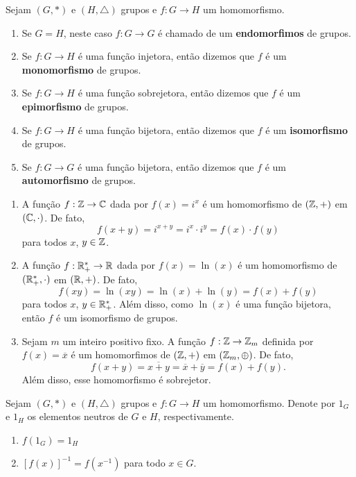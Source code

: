 \begin{observacao}
	Sejam $(G, *)$ e $(H, \triangle)$ grupos e $f : G \to H$ um homomorfismo.
	\begin{enumerate}[label={\arabic*})]
		\item Se $G = H$, neste caso $f : G \to G$ \'e chamado de um \textbf{endomorfimos} de grupos.
		\item Se $f : G \to H$ \'e uma fun\c{c}\~ao injetora, ent\~ao dizemos que $f$ \'e um \textbf{monomorfismo} de grupos.
		\item Se $f : G \to H$ \'e uma fun\c{c}\~ao sobrejetora, ent\~ao dizemos que $f$ \'e um \textbf{epimorfismo} de grupos.
		\item Se $f : G \to H$ \'e uma fun\c{c}\~ao bijetora, ent\~ao dizemos que $f$ \'e um \textbf{isomorfismo} de grupos.
		\item Se $f : G \to G$ \'e uma fun\c{c}\~ao bijetora, ent\~ao dizemos que $f$ \'e um \textbf{automorfismo} de grupos.
	\end{enumerate}
\end{observacao}

\begin{exemplos}
	\begin{enumerate}[label={\arabic*})]
		\item A fun\c{c}\~ao $f : \mathbb{Z} \to \mathbb{C}$ dada por $f(x) = i^x$ \'e um homomorfismo de $(\mathbb{Z}, +)$ em $(\mathbb{C}, \cdot)$. De fato,
		\[
			f(x + y) = i^{x + y} = i^x\cdot i^y = f(x)\cdot f(y)
		\]
		para todos $x$, $y \in \mathbb{Z}$.

		\item A fun\c{c}\~ao $f : \mathbb{R}^*_+ \to \mathbb{R}$ dada por $f(x) = \ln(x)$ \'e um homomorfismo de $(\mathbb{R}^*_+, \cdot)$ em $(\mathbb{R}, +)$. De fato,
		\[
			f(xy) = \ln(xy) = \ln(x) + \ln(y) = f(x) + f(y)
		\]
		para todos $x$, $y \in \mathbb{R}^*_+$. Al\'em disso, como $\ln(x)$ \'e uma fun\c{c}\~ao bijetora, ent\~ao $f$ \'e um isomorfismo de grupos.

		\item Sejam $m$ um inteiro positivo fixo. A fun\c{c}\~ao $f: \mathbb{Z} \to \mathbb{Z}_m$ definida por $f(x) = \overline{x}$ \'e um homomorfimos de $(\mathbb{Z}, +)$ em $(\mathbb{Z}_m, \oplus)$. De fato,
		\[
			f(x + y) = \overline{x + y} = \overline{x} + \overline{y} = f(x) + f(y).
		\]
		Al\'em disso, esse homomorfismo \'e sobrejetor.
	\end{enumerate}
\end{exemplos}

\begin{proposicao}
	Sejam $(G, *)$ e $(H, \triangle)$ grupos e $f : G \to H$ um homomorfismo. Denote por $1_G$ e $1_H$ os elementos neutros de $G$ e $H$, respectivamente.
	\begin{enumerate}[label={\roman*})]
		\item $f(1_G) = 1_H$
		\item $[f(x)]^{-1} = f(x^{-1})$ para todo $x \in G$.
	\end{enumerate}
\end{proposicao}

